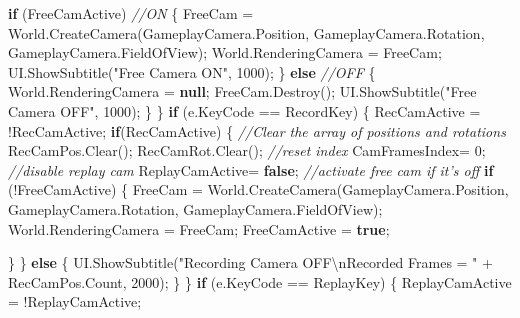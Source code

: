 \documentclass[
  openany]{book}
\newenvironment{Shaded}{\begin{snugshade}}{\end{snugshade}}
\newcommand{\CommentTok}[1]{\textcolor[rgb]{0.56,0.35,0.01}{\textit{#1}}}
\newcommand{\DecValTok}[1]{\textcolor[rgb]{0.00,0.00,0.81}{#1}}
\newcommand{\FunctionTok}[1]{\textcolor[rgb]{0.00,0.00,0.00}{#1}}
\newcommand{\KeywordTok}[1]{\textcolor[rgb]{0.13,0.29,0.53}{\textbf{#1}}}
\newcommand{\NormalTok}[1]{#1}
\newcommand{\SpecialCharTok}[1]{\textcolor[rgb]{0.00,0.00,0.00}{#1}}
\newcommand{\StringTok}[1]{\textcolor[rgb]{0.31,0.60,0.02}{#1}}
\begin{document}
\begin{Shaded}
\begin{Highlighting}[]
                \KeywordTok{if}\NormalTok{ (FreeCamActive) }\CommentTok{//ON}
\NormalTok{                \{}
\NormalTok{                    FreeCam = World.}\FunctionTok{CreateCamera}\NormalTok{(GameplayCamera.}\FunctionTok{Position}\NormalTok{, GameplayCamera.}\FunctionTok{Rotation}\NormalTok{, GameplayCamera.}\FunctionTok{FieldOfView}\NormalTok{);}
\NormalTok{                    World.}\FunctionTok{RenderingCamera}\NormalTok{ = FreeCam;}
\NormalTok{                    UI.}\FunctionTok{ShowSubtitle}\NormalTok{(}\StringTok{"Free Camera ON"}\NormalTok{, }\DecValTok{1000}\NormalTok{);}
\NormalTok{                \}}
                \KeywordTok{else} \CommentTok{//OFF}
\NormalTok{                \{}
\NormalTok{                    World.}\FunctionTok{RenderingCamera}\NormalTok{ = }\KeywordTok{null}\NormalTok{;}
\NormalTok{                    FreeCam.}\FunctionTok{Destroy}\NormalTok{();}
\NormalTok{                    UI.}\FunctionTok{ShowSubtitle}\NormalTok{(}\StringTok{"Free Camera OFF"}\NormalTok{, }\DecValTok{1000}\NormalTok{);}
\NormalTok{                \}}
\NormalTok{            \}}
            \KeywordTok{if}\NormalTok{ (e.}\FunctionTok{KeyCode}\NormalTok{ == RecordKey)}
\NormalTok{            \{}
\NormalTok{                RecCamActive = !RecCamActive;}
                \KeywordTok{if}\NormalTok{(RecCamActive)}
\NormalTok{                \{}
                    \CommentTok{//Clear the array of positions and rotations}
\NormalTok{                    RecCamPos.}\FunctionTok{Clear}\NormalTok{();}
\NormalTok{                    RecCamRot.}\FunctionTok{Clear}\NormalTok{();}
                    \CommentTok{//reset index}
\NormalTok{                    CamFramesIndex= }\DecValTok{0}\NormalTok{;}
                    \CommentTok{//disable replay cam}
\NormalTok{                    ReplayCamActive= }\KeywordTok{false}\NormalTok{;}
                    \CommentTok{//activate free cam if it's off}
                    \KeywordTok{if}\NormalTok{ (!FreeCamActive)}
\NormalTok{                    \{}
\NormalTok{                        FreeCam = World.}\FunctionTok{CreateCamera}\NormalTok{(GameplayCamera.}\FunctionTok{Position}\NormalTok{, GameplayCamera.}\FunctionTok{Rotation}\NormalTok{, GameplayCamera.}\FunctionTok{FieldOfView}\NormalTok{);}
\NormalTok{                        World.}\FunctionTok{RenderingCamera}\NormalTok{ = FreeCam;}
\NormalTok{                        FreeCamActive = }\KeywordTok{true}\NormalTok{;}
                        
\NormalTok{                    \}}
\NormalTok{                \}}
                \KeywordTok{else}
\NormalTok{                \{}
\NormalTok{                    UI.}\FunctionTok{ShowSubtitle}\NormalTok{(}\StringTok{"Recording Camera OFF}\SpecialCharTok{\textbackslash{}n}\StringTok{Recorded Frames = "}\NormalTok{ + RecCamPos.}\FunctionTok{Count}\NormalTok{, }\DecValTok{2000}\NormalTok{);}
\NormalTok{                \}}
\NormalTok{            \}}
            \KeywordTok{if}\NormalTok{ (e.}\FunctionTok{KeyCode}\NormalTok{ == ReplayKey)}
\NormalTok{            \{}
\NormalTok{                ReplayCamActive = !ReplayCamActive;}


\end{Highlighting}
\end{Shaded}
\end{document}

